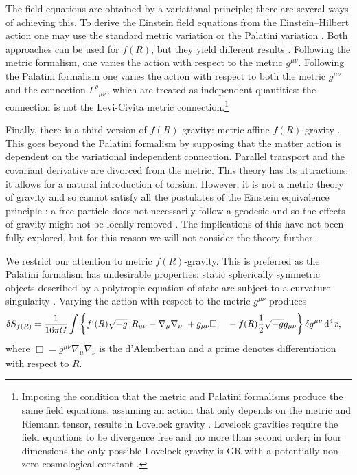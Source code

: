 The field equations are obtained by a variational principle; there are several ways of achieving this. To derive the Einstein field equations from the Einstein--Hilbert action one may use the standard metric variation or the Palatini variation \citep[section 21.2]{Misner1973}. Both approaches can be used for $f(R)$, but they yield different results \citep{Sotiriou2010, DeFelice2010}. Following the metric formalism, one varies the action with respect to the metric $g^{\mu\nu}$. Following the Palatini formalism one varies the action with respect to both the metric $g^{\mu\nu}$ and the connection ${\Gamma^\rho}_{\mu\nu}$, which are treated as independent quantities: the connection is not the Levi-Civita metric connection.\footnote{Imposing the condition that the metric and Palatini formalisms produce the same field equations, assuming an action that only depends on the metric and Riemann tensor, results in Lovelock gravity \citep{Exirifard2008}. Lovelock gravities require the field equations to be divergence free and no more than second order; in four dimensions the only possible Lovelock gravity is GR with a potentially non-zero cosmological constant \citep{Lovelock1970, Lovelock1971, Lovelock1972}.}

Finally, there is a third version of $f(R)$-gravity: metric-affine $f(R)$-gravity \citep{Sotiriou2007, Sotiriou2007b}. This goes beyond the Palatini formalism by supposing that the matter action is dependent on the variational independent connection. Parallel transport and the covariant derivative are divorced from the metric. This theory has its attractions: it allows for a natural introduction of torsion. However, it is not a metric theory of gravity and so cannot satisfy all the postulates of the Einstein equivalence principle \citep{Will2006}: a free particle does not necessarily follow a geodesic and so the effects of gravity might not be locally removed \citep{Exirifard2008}. The implications of this have not been fully explored, but for this reason we will not consider the theory further.

We restrict our attention to metric $f(R)$-gravity. This is preferred as the Palatini formalism has undesirable properties: static spherically symmetric objects described by a polytropic equation of state are subject to a curvature singularity \citep{Barausse2008b, Barausse2008a, DeFelice2010}. Varying the action with respect to the metric $g^{\mu\nu}$ produces
\begin{align}
\delta S_{f(R)} = {} & \recip{16\pi G}\int\left\{f'(R)\sqrt{-g}\left[R_{\mu\nu} - \nabla_\mu\nabla_\nu\ + g_{\mu\nu}\Box\right] \hphantom{\frac{0}{0}} \vphantom{\frac{0}{0}} - f(R)\recip{2}\sqrt{-g}g_{\mu\nu}\right\}\delta g^{\mu\nu}\,\dd^4x,
\end{align}
where $\Box = g^{\mu\nu}\nabla_\mu\nabla_\nu$ is the d'Alembertian and a prime denotes differentiation with respect to $R$.

